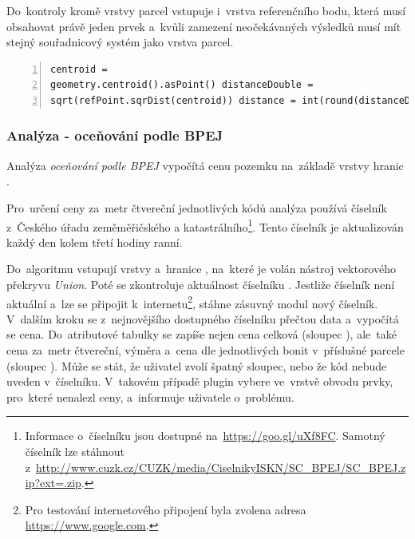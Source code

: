 Do~kontroly kromě vrstvy parcel vstupuje i~vrstva referenčního bodu,
která musí obsahovat právě jeden prvek a~kvůli zamezení neočekávaných
výsledků musí mít stejný souřadnicový systém jako vrstva parcel.

{\scriptsize
\begin{lstlisting}[style=python, caption={Analýza \textit{měření
vzdálenosti}~– výpočet vzdálenosti těžiště\newline od~referenčního
bodu}, captionpos=b,
label=analyza_vzdalenost_vypocet_vzdalenosti_teziste_od_ref_bodu,
backgroundcolor = \color{light-gray}, numbers=left] centroid =
geometry.centroid().asPoint() distanceDouble =
sqrt(refPoint.sqrDist(centroid)) distance = int(round(distanceDouble))
\end{lstlisting}}

\subsubsection{Analýza - oceňování podle BPEJ}
\label{analyza_bpej}

Analýza \textit{oceňování podle BPEJ} vypočítá cenu pozemku na~základě
vrstvy hranic .

Pro~určení ceny za~metr čtvereční jednotlivých kódů  analýza
používá číselník  z~Českého úřadu zeměměřičského a
katastrálního\footnote{Informace o~číselníku jsou dostupné
na~\url{https://goo.gl/uXf8FC}. Samotný číselník lze stáhnout
z~\url{http://www.cuzk.cz/CUZK/media/CiselnikyISKN/SC_BPEJ/SC_BPEJ.zip?ext=.zip}.}. Tento
číselník je aktualizován každý den kolem třetí hodiny ranní.

Do~algoritmu vstupují vrstvy \texttt{} a~hranice ,
na~které je volán nástroj vektorového překryvu \textit{Union}. Poté se
zkontroluje aktuálnost číselníku . Jestliže číselník není
aktuální a~lze se připojit k~internetu\footnote{Pro testování
internetového připojení byla zvolena adresa
\url{https://www.google.com}.}, stáhne zásuvný modul nový
číselník. V~dalším kroku se z~nejnovějšího dostupného číselníku
přečtou data a~vypočítá se cena. Do~atributové tabulky se zapíše nejen
cena celková (sloupec \texttt{}), ale~také cena
za~metr čtvereční, výměra a~cena dle jednotlivých bonit v~příslušné
parcele (sloupec
\texttt{}). Může se stát, že
uživatel zvolí špatný sloupec, nebo že kód  nebude uveden
v~číselníku. V~takovém případě plugin vybere ve~vrstvě obvodu prvky,
pro~které nenalezl ceny, a~informuje uživatele o~problému.

